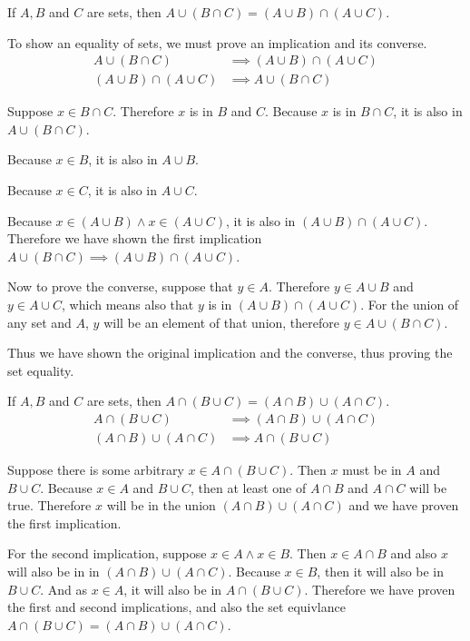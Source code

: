\documentclass[openany, 12pt]{book}
\begin{document}
\begin{exercise}{}{}
	If $A, B$ and $C$ are sets, then $A \cup(B \cap C)=(A \cup B) \cap(A \cup C)$.
	\begin{alist}
		\item To show an equality of sets, we must prove an implication and its
		converse.
		\begin{align*}
			A \cup(B \cap C)          & \implies(A \cup B) \cap(A \cup C) \\
			(A \cup B) \cap(A \cup C) & \implies A \cup(B \cap C)
		\end{align*}
		\item Suppose $x \in B\cap C$. Therefore $x$ is in $B$ and $C$. Because $x$ is
		in $B\cap C$, it is also in $A \cup (B \cap C)$.
		\item Because $x\in B$, it is also in $A\cup B$.
		\item Because $x\in C$, it is also in $A\cup C$.
		\item Because $x\in (A \cup B) \land x\in(A \cup C)$, it is also in $(A\cup B) \cap
			(A\cup C)$. Therefore we have shown the first implication
		$A \cup(B \cap C)\implies(A \cup B) \cap(A \cup C)$.
		\item
		Now to prove the converse, suppose that $y \in A$. Therefore $y\in A \cup B$
		and $y\in A\cup C$, which means also that $y$ is in $(A\cup B) \cap (A
			\cup C)$. For the union of any set and $A$, $y$ will be an element of that
		union, therefore $y \in A \cup (B\cap C)$.
		\item Thus we have shown the original implication and the converse, thus proving
		the set equality.
	\end{alist}
\end{exercise}

\begin{exercise}{}{}
	If $A, B$ and $C$ are sets, then $A \cap(B \cup C)=(A \cap B) \cup(A \cap
		C)$.
	\begin{align*}
		A \cap(B \cup C)          & \implies(A \cap B) \cup(A \cap C) \\
		(A \cap B) \cup(A \cap C) & \implies A \cap(B \cup C)
	\end{align*}
	\begin{alist}
		\item
		Suppose there is some arbitrary $x\in A\cap(B\cup C)$. Then $x$ must be in $A$
		and $B\cup C$. Because $x\in A$ and $B\cup C$, then at least one of $A\cap B$ and $A\cap C$ will be true.
		Therefore $x$ will be in the union $(A\cap B) \cup (A\cap C)$ and we have
		proven the first implication.
		\item For the second implication, suppose $x\in A \land x \in B$. Then $x\in A
			\cap B$ and also $x$ will also be in in $(A\cap B) \cup (A\cap C)$. Because
		$x\in B$, then it will also be in $B\cup C$. And as $x\in A$, it will also
		be in $A \cap (B\cup C)$. Therefore we have proven the first and second
		implications, and also the set equivlance $A \cap(B \cup C)=(A \cap B)
			\cup(A \cap C)$.
	\end{alist}
\end{exercise}
\end{document}
